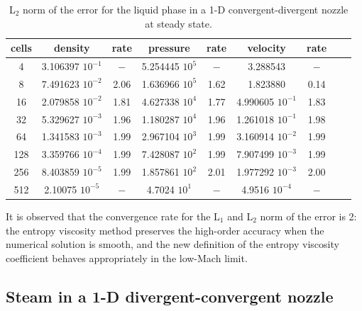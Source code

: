 %
%
\begin{table}[H]
\begin{center}
 \caption{\label{tbl:l2_norm_liq} L$_2$ norm of the error for the liquid phase in a 1-D convergent-divergent nozzle at steady state.}
 \begin{tabular}{|c|c|c|c|c|c|c|c|c|}
 \hline
cells& density            & rate & pressure          & rate & velocity           & rate \\ \hline
4    & 3.106397 $10^{-1}$ & $-$  & 5.254445 $10^{5}$ & $-$  & 3.288543           & $-$  \\ \hline
8    & 7.491623 $10^{-2}$ & 2.06 & 1.636966 $10^{5}$ & 1.62 & 1.823880           & 0.14 \\ \hline
16   & 2.079858 $10^{-2}$ & 1.81 & 4.627338 $10^{4}$ & 1.77 & 4.990605 $10^{-1}$ & 1.83 \\ \hline
32   & 5.329627 $10^{-3}$ & 1.96 & 1.180287 $10^{4}$ & 1.96 & 1.261018 $10^{-1}$ & 1.98 \\ \hline
64   & 1.341583 $10^{-3}$ & 1.99 & 2.967104 $10^{3}$ & 1.99 & 3.160914 $10^{-2}$ & 1.99 \\ \hline
128  & 3.359766 $10^{-4}$ & 1.99 & 7.428087 $10^{2}$ & 1.99 & 7.907499 $10^{-3}$ & 1.99 \\ \hline
256  & 8.403859 $10^{-5}$ & 1.99 & 1.857861 $10^{2}$ & 2.01 & 1.977292 $10^{-3}$ & 2.00 \\ \hline
512  & 2.10075  $10^{-5}$ & $-$ & 4.7024   $10^{1}$ & $-$ & 4.9516   $10^{-4}$ & $-$ \\ \hline
\end{tabular}
\end{center}
\end{table}
It is observed that the convergence rate for the L$_1$ and L$_2$ norm of the error is 2: the entropy viscosity method preserves the high-order accuracy when the numerical solution is smooth, and the new definition of the entropy viscosity coefficient behaves appropriately in the low-Mach limit.

\subsection{Steam in a 1-D divergent-convergent nozzle} \label{sec:steam_nozzle}

